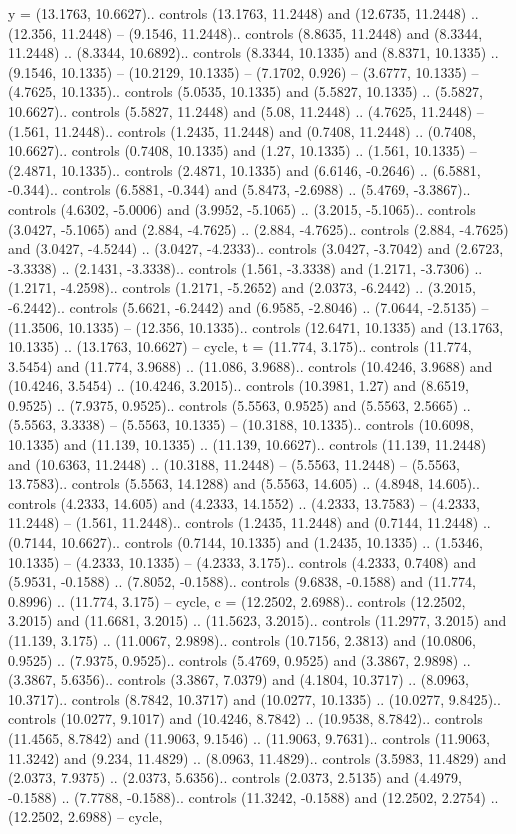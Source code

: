 {y} = {(13.1763, 10.6627).. controls (13.1763, 11.2448) and (12.6735, 11.2448) .. (12.356, 11.2448) -- (9.1546, 11.2448).. controls (8.8635, 11.2448) and (8.3344, 11.2448) .. (8.3344, 10.6892).. controls (8.3344, 10.1335) and (8.8371, 10.1335) .. (9.1546, 10.1335) -- (10.2129, 10.1335) -- (7.1702, 0.926) -- (3.6777, 10.1335) -- (4.7625, 10.1335).. controls (5.0535, 10.1335) and (5.5827, 10.1335) .. (5.5827, 10.6627).. controls (5.5827, 11.2448) and (5.08, 11.2448) .. (4.7625, 11.2448) -- (1.561, 11.2448).. controls (1.2435, 11.2448) and (0.7408, 11.2448) .. (0.7408, 10.6627).. controls (0.7408, 10.1335) and (1.27, 10.1335) .. (1.561, 10.1335) -- (2.4871, 10.1335).. controls (2.4871, 10.1335) and (6.6146, -0.2646) .. (6.5881, -0.344).. controls (6.5881, -0.344) and (5.8473, -2.6988) .. (5.4769, -3.3867).. controls (4.6302, -5.0006) and (3.9952, -5.1065) .. (3.2015, -5.1065).. controls (3.0427, -5.1065) and (2.884, -4.7625) .. (2.884, -4.7625).. controls (2.884, -4.7625) and (3.0427, -4.5244) .. (3.0427, -4.2333).. controls (3.0427, -3.7042) and (2.6723, -3.3338) .. (2.1431, -3.3338).. controls (1.561, -3.3338) and (1.2171, -3.7306) .. (1.2171, -4.2598).. controls (1.2171, -5.2652) and (2.0373, -6.2442) .. (3.2015, -6.2442).. controls (5.6621, -6.2442) and (6.9585, -2.8046) .. (7.0644, -2.5135) -- (11.3506, 10.1335) -- (12.356, 10.1335).. controls (12.6471, 10.1335) and (13.1763, 10.1335) .. (13.1763, 10.6627) -- cycle},
{t} = {(11.774, 3.175).. controls (11.774, 3.5454) and (11.774, 3.9688) .. (11.086, 3.9688).. controls (10.4246, 3.9688) and (10.4246, 3.5454) .. (10.4246, 3.2015).. controls (10.3981, 1.27) and (8.6519, 0.9525) .. (7.9375, 0.9525).. controls (5.5563, 0.9525) and (5.5563, 2.5665) .. (5.5563, 3.3338) -- (5.5563, 10.1335) -- (10.3188, 10.1335).. controls (10.6098, 10.1335) and (11.139, 10.1335) .. (11.139, 10.6627).. controls (11.139, 11.2448) and (10.6363, 11.2448) .. (10.3188, 11.2448) -- (5.5563, 11.2448) -- (5.5563, 13.7583).. controls (5.5563, 14.1288) and (5.5563, 14.605) .. (4.8948, 14.605).. controls (4.2333, 14.605) and (4.2333, 14.1552) .. (4.2333, 13.7583) -- (4.2333, 11.2448) -- (1.561, 11.2448).. controls (1.2435, 11.2448) and (0.7144, 11.2448) .. (0.7144, 10.6627).. controls (0.7144, 10.1335) and (1.2435, 10.1335) .. (1.5346, 10.1335) -- (4.2333, 10.1335) -- (4.2333, 3.175).. controls (4.2333, 0.7408) and (5.9531, -0.1588) .. (7.8052, -0.1588).. controls (9.6838, -0.1588) and (11.774, 0.8996) .. (11.774, 3.175) -- cycle},
{c} = {(12.2502, 2.6988).. controls (12.2502, 3.2015) and (11.6681, 3.2015) .. (11.5623, 3.2015).. controls (11.2977, 3.2015) and (11.139, 3.175) .. (11.0067, 2.9898).. controls (10.7156, 2.3813) and (10.0806, 0.9525) .. (7.9375, 0.9525).. controls (5.4769, 0.9525) and (3.3867, 2.9898) .. (3.3867, 5.6356).. controls (3.3867, 7.0379) and (4.1804, 10.3717) .. (8.0963, 10.3717).. controls (8.7842, 10.3717) and (10.0277, 10.1335) .. (10.0277, 9.8425).. controls (10.0277, 9.1017) and (10.4246, 8.7842) .. (10.9538, 8.7842).. controls (11.4565, 8.7842) and (11.9063, 9.1546) .. (11.9063, 9.7631).. controls (11.9063, 11.3242) and (9.234, 11.4829) .. (8.0963, 11.4829).. controls (3.5983, 11.4829) and (2.0373, 7.9375) .. (2.0373, 5.6356).. controls (2.0373, 2.5135) and (4.4979, -0.1588) .. (7.7788, -0.1588).. controls (11.3242, -0.1588) and (12.2502, 2.2754) .. (12.2502, 2.6988) -- cycle},
